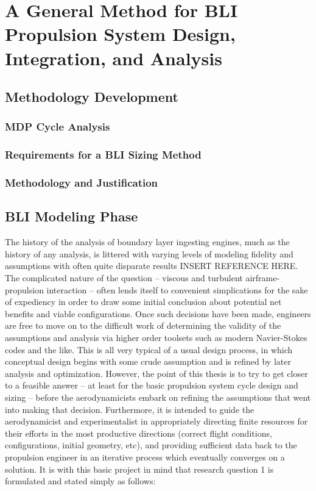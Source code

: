 \chapter{A General Method for BLI Propulsion System Design, Integration, and Analysis}
\section{Methodology Development}
\subsection{MDP Cycle Analysis}
\subsection{Requirements for a BLI Sizing Method}
\subsection{Methodology and Justification}
\section{BLI Modeling Phase}
The history of the analysis of boundary layer ingesting engines, much as the history of any analysis, is littered with varying levels of modeling fidelity and assumptions with often quite disparate results INSERT REFERENCE HERE.  The complicated nature of the question -- viscous and turbulent airframe-propulsion interaction -- often lends itself to convenient simplications for the sake of expediency in order to draw some initial conclusion about potential net benefits and viable configurations.  Once such decisions have been made, engineers are free to move on to the difficult work of determining the validity of the assumptions and analysis via higher order toolsets such as modern Navier-Stokes codes and the like.  This is all very typical of a usual design process, in which conceptual design begins with some crude assumption and is refined by later analysis and optimization.  However, the point of this thesis is to try to get closer to a feasible answer -- at least for the basic propulsion system cycle design and sizing -- before the aerodynamicists embark on refining the assumptions that went into making that decision.  Furthermore, it is intended to guide the aerodynamicist and experimentalist in appropriately directing finite resources for their efforts in the most productive directions (correct flight conditions, configurations, initial geometry, etc), and providing sufficient data back to the propulsion engineer in an iterative process which eventually converges on a solution.  It is with this basic project in mind that research question 1 is formulated and stated simply as follows:
\vspace{25pt}
\vspace{5mm}
\vspace{5mm}

